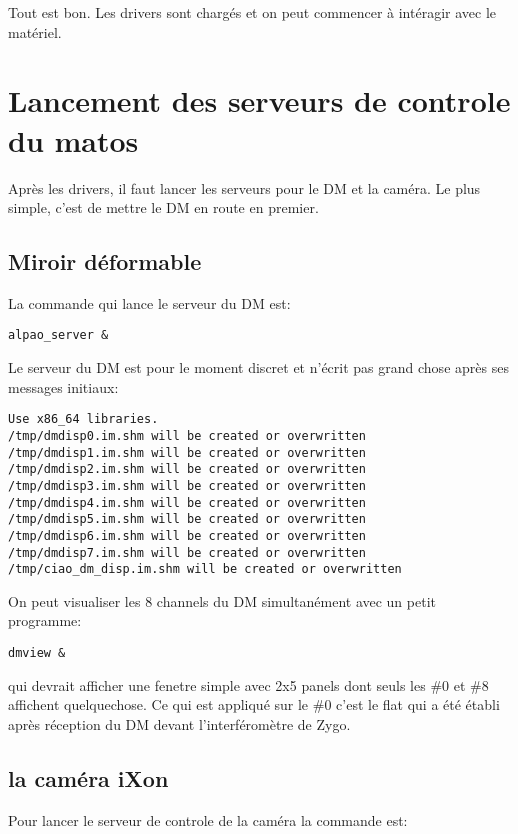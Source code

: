 \documentclass[11pt]{article}
\begin{document}
Tout est bon. Les drivers sont chargés et on peut commencer à
intéragir avec le matériel.
\section{Lancement des serveurs de controle du matos}
\label{sec-2}


Après les drivers, il faut lancer les serveurs pour le DM et la
caméra. Le plus simple, c'est de mettre le DM en route en premier.
\subsection{Miroir déformable}
\label{sec-2-1}


La commande qui lance le serveur du DM est:


\begin{verbatim}
alpao_server &
\end{verbatim}

Le serveur du DM est pour le moment discret et n'écrit pas grand
chose après ses messages initiaux:


\begin{verbatim}
Use x86_64 libraries.
/tmp/dmdisp0.im.shm will be created or overwritten
/tmp/dmdisp1.im.shm will be created or overwritten
/tmp/dmdisp2.im.shm will be created or overwritten
/tmp/dmdisp3.im.shm will be created or overwritten
/tmp/dmdisp4.im.shm will be created or overwritten
/tmp/dmdisp5.im.shm will be created or overwritten
/tmp/dmdisp6.im.shm will be created or overwritten
/tmp/dmdisp7.im.shm will be created or overwritten
/tmp/ciao_dm_disp.im.shm will be created or overwritten
\end{verbatim}

On peut visualiser les 8 channels du DM simultanément avec un petit
programme:


\begin{verbatim}
dmview &
\end{verbatim}

qui devrait afficher une fenetre simple avec 2x5 panels dont seuls
les \#0 et \#8 affichent quelquechose. Ce qui est appliqué sur le \#0
c'est le flat qui a été établi après réception du DM devant
l'interféromètre de Zygo.
\subsection{la caméra iXon}
\label{sec-2-2}


Pour lancer le serveur de controle de la caméra la commande est:
\end{document}
